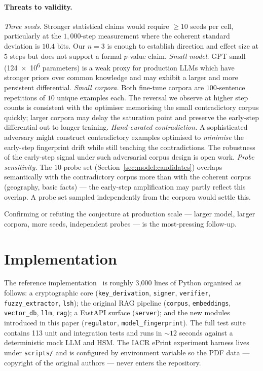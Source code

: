 \documentclass[11pt,a4paper]{article}
\begin{document}
\paragraph{Threats to validity.}
%
\emph{Three seeds.}  Stronger statistical claims would require
$\geq 10$ seeds per cell, particularly at the
$1{,}000$\nobreakdash-step measurement where the coherent standard
deviation is $10.4$ bits.  Our $n = 3$ is enough to establish
direction and effect size at $5$ steps but does not support a
formal $p$\nobreakdash-value claim.
%
\emph{Small model.}  GPT small (\num{124e6}
parameters) is a weak proxy for production LLMs which have stronger
priors over common knowledge and may exhibit a larger and more
persistent differential.
%
\emph{Small corpora.}  Both fine\nobreakdash-tune corpora are
$100$\nobreakdash-sentence repetitions of $10$ unique examples each.
The reversal we observe at higher step counts is consistent with
the optimiser memorising the small contradictory corpus quickly;
larger corpora may delay the saturation point and preserve the
early\nobreakdash-step differential out to longer training.
%
\emph{Hand\nobreakdash-curated contradiction.}  A sophisticated
adversary might construct contradictory examples optimised to
\emph{minimise} the early\nobreakdash-step fingerprint drift while
still teaching the contradictions.  The robustness of the
early\nobreakdash-step signal under such adversarial corpus design
is open work.
%
\emph{Probe sensitivity.}  The $10$\nobreakdash-probe set
(Section~\ref{sec:model:candidates}) overlaps semantically with
the contradictory corpus more than with the coherent corpus
(geography, basic facts) — the early\nobreakdash-step amplification
may partly reflect this overlap.  A probe set sampled
independently from the corpora would settle this.

Confirming or refuting the conjecture at production scale —
larger model, larger corpora, more seeds, independent probes — is
the most\nobreakdash-pressing follow\nobreakdash-up.

\section{Implementation}
\label{sec:impl}

The reference implementation~\cite{ragsign-impl} is roughly
3{,}000 lines of Python organised as follows: a cryptographic core
(\texttt{key\_derivation}, \texttt{signer}, \texttt{verifier},
\texttt{fuzzy\_extractor}, \texttt{lsh}); the original RAG pipeline
(\texttt{corpus}, \texttt{embeddings}, \texttt{vector\_db},
\texttt{llm}, \texttt{rag}); a FastAPI surface (\texttt{server});
and the new modules introduced in this paper (\texttt{regulator},
\texttt{model\_fingerprint}).  The full test suite contains 113
unit and integration tests and runs in ${\sim}\!12$ seconds against
a deterministic mock LLM and HSM.  The IACR ePrint experiment
harness lives under \texttt{scripts/} and is configured by
environment variable so the PDF data — copyright of the original
authors — never enters the repository.
\end{document}
